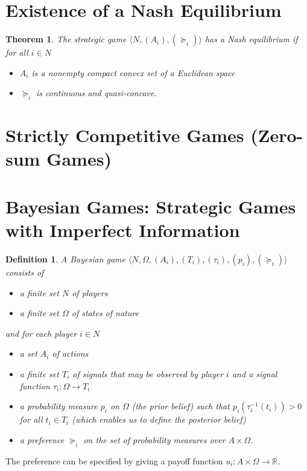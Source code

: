 \documentclass[openany]{book}
\newtheorem{definition}{Definition}[chapter]
\newtheorem{theorem}{Theorem}[chapter]
\begin{document}
\section{Existence of a Nash Equilibrium}
\begin{theorem}
The strategic game $\langle N,(A_i),(\succeq_i)\rangle$ has a Nash equilibrium if for all $i\in N$
\begin{itemize}
\item $A_i$ is a nonempty compact convex set of a Euclidean space
\item $\succeq_i$ is continuous and quasi-concave.
\end{itemize}
\end{theorem}

\section{Strictly Competitive Games (Zero-sum Games)}

\section{Bayesian Games: Strategic Games with Imperfect Information}
\begin{definition}
A Bayesian game $\langle N,\Omega,(A_i),(T_i),(\tau_i),(p_i),(\succeq_i)\rangle$ consists of
\begin{itemize}
\item a finite set $N$ of players
\item a finite set $\Omega$ of states of nature
\end{itemize}
and for each player $i\in N$
\begin{itemize}
\item a set $A_i$ of actions
\item a finite set $T_i$ of signals that may be observed by player $i$ and a signal function $\tau_i:\Omega\rightarrow T_i$
\item a probability measure $p_i$ on $\Omega$ (the prior belief) such that $p_i(\tau_i^{-1}(t_i))>0$ for all $t_i\in T_i$ (which enables us to define the posterior belief)
\item a preference $\succeq_i$ on the set of probability measures over $A\times\Omega$.
\end{itemize}
\end{definition}
The preference can be specified by giving a payoff function $u_i:A\times\Omega\rightarrow\mathbb{R}$.
\end{document}
